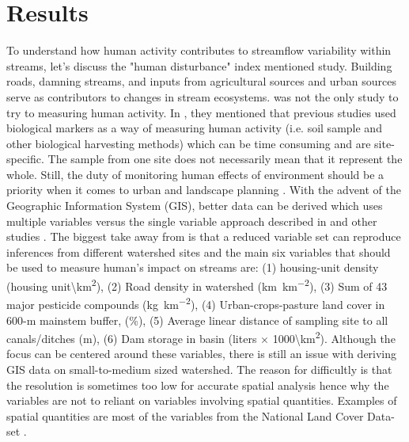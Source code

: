 \documentclass[a4paper,man,biblatex]{apa7}
\begin{document}
\section{Results}
\par To understand how human activity contributes to streamflow variability within streams, let's discuss the "human disturbance" index mentioned \textcite{falcone_2016} study. Building roads, damning streams, and inputs from agricultural sources and urban sources serve as contributors to changes in stream ecosystems. \textcite{falcone_2016} was not the only study to try to measuring human activity. In \textcite{stein_2002}, they mentioned that previous studies used biological markers as a way of measuring human activity (i.e. soil sample and other biological harvesting methods) which can be time consuming and are site-specific. The sample from one site does not necessarily mean that it represent the whole. Still, the duty of monitoring human effects of environment should be a priority when it comes to urban and landscape planning \autocite{stein_2002}. With the advent of the Geographic Information System (GIS), better data can be derived which uses multiple variables versus the single variable approach described in \textcite{stein_200} and other studies \autocite{falcone_2016}. The biggest take away from \textcite{falcone_2016} is that a reduced variable set can reproduce inferences from different watershed sites and the main six variables that should be used to measure human's impact on streams are: (1) housing-unit density (housing unit\textbackslash\si{\square\kilo\meter}), (2) Road density in watershed (\si{\kilo\meter\per\square\kilo\meter}), (3) Sum of 43 major pesticide compounds (\si{\kilo\gram\per\square\kilo\meter}), (4) Urban-crops-pasture land cover in 600-m mainstem buffer, (\%), (5) Average linear distance of sampling site to all canals/ditches (m), (6) Dam storage in basin (liters $\times$ 1000\textbackslash\si{\square\kilo\meter}). Although the focus can be centered around these variables, there is still an issue with deriving GIS data on small-to-medium sized watershed. The reason for difficultly is that the resolution is sometimes too low for accurate spatial analysis hence why the variables are not to reliant on variables involving spatial quantities. Examples of spatial quantities are most of the variables from the National Land Cover Data-set \autocite{falcone_2016}.
\end{document}
